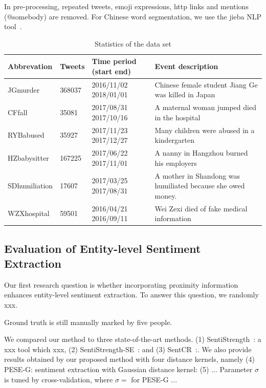 \documentclass[runningheads]{llncs}
\begin{document}
In pre-processing, repeated tweets, emoji expressions, http links and mentions (@somebody) are removed. For Chinese word segmentation, we use the jieba NLP tool~\cite{}.%

\begin{table}[ht]
\caption{Statistics of the data set}\label{table:social event}
\begin{center}
\tiny
\begin{tabular}{|l|l|l|l|}
\hline
Abbrevation   & Tweets & Time period (start end) & Event description                                           \\ \hline
JGmurder      & 368037 & 2016/11/02 2018/01/01   & Chinese female student Jiang Ge was killed in Japan         \\ \hline
CFfall        & 35081  & 2017/08/31 2017/10/16   & A maternal woman jumped died in the hospital                \\ \hline
RYBabused     & 35927  & 2017/11/23 2017/12/27   & Many children were abused in a kindergarten                 \\ \hline
HZbabysitter  & 167225 & 2017/06/22 2017/11/01   & A nanny in Hangzhou burned his employers                    \\ \hline
SDhumiliation & 17607  & 2017/03/25 2017/08/31   & A mother in Shandong was humiliated because she owed money. \\ \hline
WZXhospital   & 59501  & 2016/04/21 2016/09/11   & Wei Zexi died of fake medical information                   \\ \hline
\end{tabular}
\end{center}
\label{default}
\end{table}


\subsection{Evaluation of Entity-level Sentiment Extraction}
Our first research question is whether incorporating proximity information enhances entity-level sentiment extraction.  To answer this question, we randomly xxx.

Ground truth is still manually marked by five people.

We compared our method to three state-of-the-art methods. (1) SentiStrength~\cite{}: a xxx tool which xxx, (2) SentiStrength-SE~\cite{}: and (3) SentCR~\cite{}:. %
We also provide results obtained by our proposed method with four distance kernels, namely (4) PESE-G: sentiment extraction with Gaussian distance kernel: (5) ... %
Parameter $\sigma$ is tuned by cross-validation, where $\sigma=$ for PESE-G ...%
\end{document}
